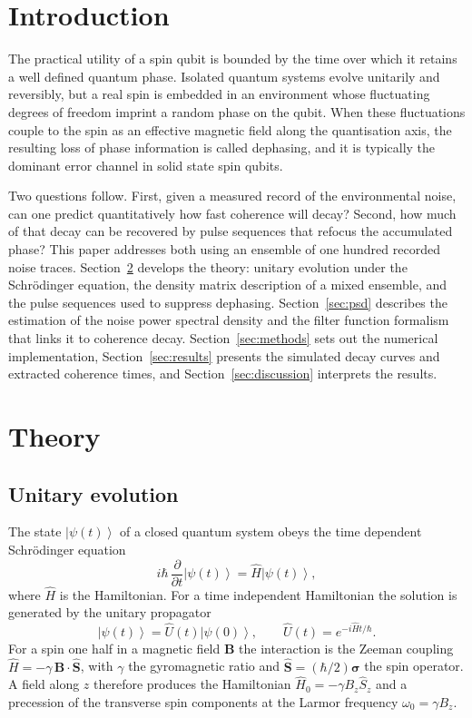 \documentclass[10pt,twocolumn,a4paper]{article}
\newcommand{\ket}[1]{\left|#1\right\rangle}
\begin{document}
\section{Introduction}

The practical utility of a spin qubit is bounded by the time over which it
retains a well defined quantum phase. Isolated quantum systems evolve unitarily
and reversibly, but a real spin is embedded in an environment whose fluctuating
degrees of freedom imprint a random phase on the qubit. When these fluctuations
couple to the spin as an effective magnetic field along the quantisation axis,
the resulting loss of phase information is called dephasing, and it is typically
the dominant error channel in solid state spin qubits.

Two questions follow. First, given a measured record of the environmental noise,
can one predict quantitatively how fast coherence will decay? Second, how much of
that decay can be recovered by pulse sequences that refocus the accumulated
phase? This paper addresses both using an ensemble of one hundred recorded noise
traces. Section~\ref{sec:theory} develops the theory: unitary evolution under the
Schr\"odinger equation, the density matrix description of a mixed ensemble, and
the pulse sequences used to suppress dephasing. Section~\ref{sec:psd} describes
the estimation of the noise power spectral density and the filter function
formalism that links it to coherence decay. Section~\ref{sec:methods} sets out
the numerical implementation, Section~\ref{sec:results} presents the simulated
decay curves and extracted coherence times, and Section~\ref{sec:discussion}
interprets the results.

\section{Theory}\label{sec:theory}

\subsection{Unitary evolution}

The state $\ket{\psi(t)}$ of a closed quantum system obeys the time dependent
Schr\"odinger equation
\begin{equation}
i\hbar\,\frac{\partial}{\partial t}\ket{\psi(t)} = \hat{H}\ket{\psi(t)},
\label{eq:tdse}
\end{equation}
where $\hat{H}$ is the Hamiltonian. For a time independent Hamiltonian the
solution is generated by the unitary propagator
\begin{equation}
\ket{\psi(t)} = \hat{U}(t)\ket{\psi(0)}, \qquad
\hat{U}(t) = e^{-i\hat{H}t/\hbar}.
\label{eq:propagator}
\end{equation}
For a spin one half in a magnetic field $\mathbf{B}$ the interaction is the
Zeeman coupling $\hat{H} = -\gamma\,\mathbf{B}\cdot\hat{\mathbf{S}}$, with
$\gamma$ the gyromagnetic ratio and $\hat{\mathbf{S}} = (\hbar/2)\boldsymbol{\sigma}$
the spin operator. A field along $z$ therefore produces the Hamiltonian
$\hat{H}_0 = -\gamma B_z \hat{S}_z$ and a precession of the transverse spin
components at the Larmor frequency $\omega_0 = \gamma B_z$.
\end{document}

